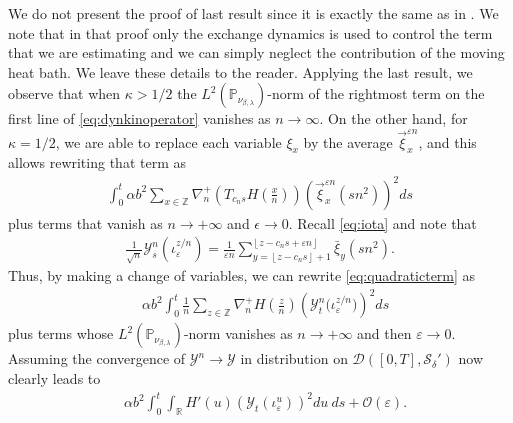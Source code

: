 \documentclass[a4paper, reqno, 12pt]{amsart}
\theoremstyle{plain}
\theoremstyle{definition}
\newcommand{\floor}[1]{\left\lfloor #1 \right\rfloor}
\newcommand{\R}{\mathbb{R}}
\begin{document}
We do not present the proof of last result since it is exactly the same as in \cite{GJS17}. We note that in that proof only the exchange dynamics is used to control the term that we are estimating and we can simply neglect the contribution of the moving heat bath. We leave these details to the reader. Applying the  last result,  we observe that when $\kappa>1/2$ the  $L^2(\mathbb P_{\nu_{\beta,\lambda}})$-norm of the rightmost term on the first line of \eqref{eq:dynkinoperator} vanishes as $n\to\infty$. On the other hand, for $\kappa=1/2$, we are able to replace each variable $\xi_x$ by the average $ \overrightarrow{\xi}_x^{\varepsilon n} $, and this allows   rewriting that term as 
\begin{align}\label{eq:quadraticterm}
    \int_0^t\alpha b^2 \sum_{x\in\mathbb{Z}} \nabla^+_n \left(T_{c_n s} H\left(\tfrac{x}{n}\right) \right)\left(\overrightarrow{\xi}^{\varepsilon n}_x(sn^2)\right)^2  ds 
\end{align} 
plus terms that vanish as $n\to+\infty$ and $\epsilon\to0$.
Recall \eqref{eq:iota} and note that 
\begin{align*}
    \frac{1}{\sqrt{n}}\mathcal{Y}^n_s(\iota_{\varepsilon}^{{z}/n}) = \frac{1}{\varepsilon n} \sum_{y = \floor{z-c_ns}+1}^{\floor{z -c_ns+\varepsilon n}} \bar\xi_{y}(sn^2).
\end{align*}
Thus, by making a change of variables,  we can rewrite \eqref{eq:quadraticterm} as
\begin{align*}
   &  \alpha b^2\int_0^t \frac{1}{n}\sum_{z\in\mathbb{Z}} \nabla^+_n H\left(\tfrac{z}{n}\right) \left(\mathcal{Y}^n_t
   \Big(\iota_{\varepsilon}^{z/n}\Big)\right)^2  ds
\end{align*}
plus terms whose  $L^2(\mathbb P_{\nu_{\beta,\lambda}})$-norm  vanishes as $n\to+\infty$ and then $\varepsilon\to0$.
Assuming the convergence of $\mathcal{Y}^n\to\mathcal{Y}$ in distribution on $\mathcal D([0,T],\mathcal{S}_{\delta}')$ now clearly leads to 
\begin{align*}
    &\alpha b^2\int_0^t \int_{\R} H'\left(u\right) \left(\mathcal{Y}_t(\iota_{\varepsilon}^u)\right)^2  du\  ds + \mathcal{O}(\varepsilon).
\end{align*}
\end{document}
